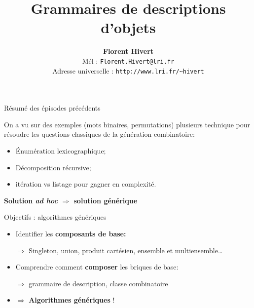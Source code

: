 \documentclass{beamer}
\title[Algorithmes combinatoires]%
{\bf Grammaires de descriptions d'objets}
\author{\textbf{\Large Florent Hivert}\\[5mm]
  Mél : \texttt{Florent.Hivert@lri.fr}\\
  Adresse universelle : \texttt{http://www.lri.fr/\~{ }hivert}
}
\date{}
\def\opstyle#1{\ensuremath{\operatorname{#1}}}
\begin{document}
\newcommand{\Count}{\opstyle{count}}
\newcommand{\List}{\opstyle{list}}
\newcommand{\Iter}{\opstyle{iter}}
\newcommand{\Unrank}{\opstyle{unrank}}
\newcommand{\Rank}{\opstyle{rank}}
\newcommand{\First}{\opstyle{first}}
\newcommand{\Next}{\opstyle{next}}
\newcommand{\Random}{\opstyle{random}}

\newcommand{\Concat}{\opstyle{concat}}
\newcommand{\BS}{\opstyle{BitString}}
\newcommand{\Perm}{\opstyle{Perm}}
\newcommand{\Union}{\opstyle{Union}}
\newcommand{\Prod}{\opstyle{Prod}}

\newcommand{\mA}{\mathcal{A}}
\newcommand{\mB}{\mathcal{B}}
\newcommand{\mC}{\mathcal{C}}
\newcommand{\mD}{\mathcal{D}}
\newcommand{\mE}{\mathcal{E}}
\newcommand{\mI}{\mathcal{I}}
\newcommand{\mZ}{\mathcal{Z}}

\newcommand{\Oh}{O}

\frame{\titlepage}
\begin{frame}{Résumé des épisodes précédents}

  On a vu sur des exemples (mots binaires, permutations) plusieurs technique
  pour résoudre les questions classiques de la génération combinatoire:
  \begin{itemize}
  \item Énumération lexicographique;
    \medskip

  \item Décomposition récursive;
    \medskip

  \item itération vs listage pour gagner en complexité.
  \end{itemize}
  \pause\bigskip\bigskip

  \begin{center}
    \textbf{\Large Solution \textit{ad hoc}
      $\Longrightarrow$ solution générique}
  \end{center}
\end{frame}

\begin{frame}{Objectifs : algorithmes génériques}

  \begin{itemize}
  \item Identifier les \textbf{composants de base:}
    \medskip

    $\Longrightarrow$ Singleton, union, produit cartésien, ensemble et
    multiensemble\dots \pause\bigskip

  \item Comprendre comment \textbf{composer} les briques de base:
    \medskip

    $\Longrightarrow$ grammaire de description, classe combinatoire
    \bigskip

  \item $\Longrightarrow$ \textbf{Algorithmes génériques} !
  \end{itemize}
\end{frame}
\end{document}
